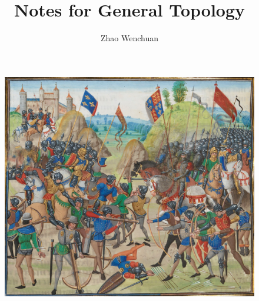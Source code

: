 \documentclass{report}
\title{Notes for General Topology}
\author{Zhao Wenchuan }
\begin{document}
\begin{figure}
	\centering
	\includegraphics[width=345pt]{notes-for-general-topology/media/Battle_of_crecy_froissart}	
\end{figure}

\maketitle





\end{document}

